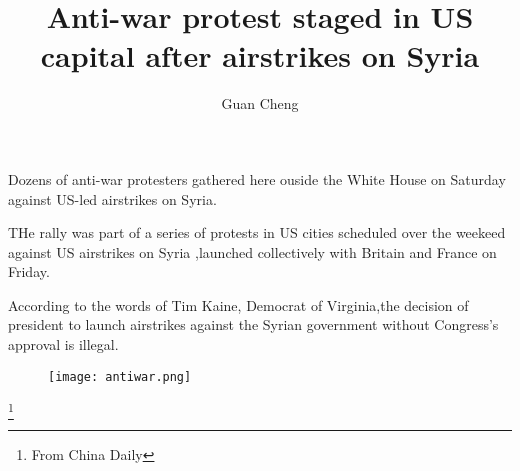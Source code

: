 \documentclass[UTF8]{article}
\author{Guan Cheng}
\title{Anti-war protest staged in US capital after airstrikes on Syria}
\begin{document}
\maketitle

  Dozens of anti-war protesters gathered here ouside the White House on Saturday
against US-led airstrikes on Syria.

  THe rally was part of a series of protests in US cities scheduled over the
weekeed against US airstrikes on Syria ,launched  collectively with Britain
and France on Friday.

  According to the words of Tim Kaine, Democrat of Virginia,the decision of
president to launch airstrikes against the Syrian government without Congress's
approval is illegal.

   \begin{figure}[ht]
     \centering
     \texttt{[image: antiwar.png]}
   \end{figure}

   \footnote{\centering From China Daily}
 
\end{document}
